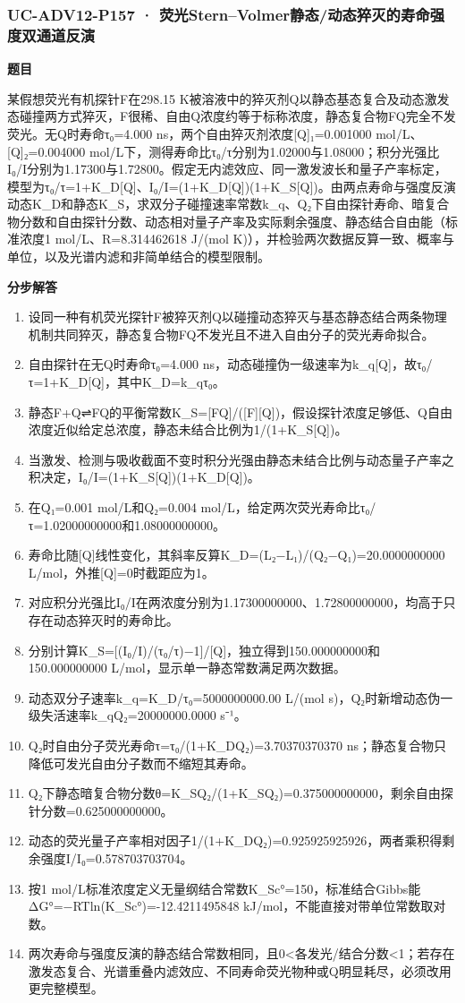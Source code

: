 \documentclass[UTF8,11pt,a4paper]{ctexart}
\begin{document}
\subsubsection*{UC-ADV12-P157 · 荧光Stern–Volmer静态/动态猝灭的寿命强度双通道反演}
\noindent\textbf{题目}\par
某假想荧光有机探针F在298.15 K被溶液中的猝灭剂Q以静态基态复合及动态激发态碰撞两方式猝灭，F很稀、自由Q浓度约等于标称浓度，静态复合物FQ完全不发荧光。无Q时寿命τ₀=4.000 ns，两个自由猝灭剂浓度[Q]₁=0.001000 mol/L、[Q]₂=0.004000 mol/L下，测得寿命比τ₀/τ分别为1.02000与1.08000；积分光强比I₀/I分别为1.17300与1.72800。假定无内滤效应、同一激发波长和量子产率标定，模型为τ₀/τ=1+K\_D[Q]、I₀/I=(1+K\_D[Q])(1+K\_S[Q])。由两点寿命与强度反演动态K\_D和静态K\_S，求双分子碰撞速率常数k\_q、Q₂下自由探针寿命、暗复合物分数和自由探针分数、动态相对量子产率及实际剩余强度、静态结合自由能（标准浓度1 mol/L、R=8.314462618 J/(mol K)），并检验两次数据反算一致、概率与单位，以及光谱内滤和非简单结合的模型限制。\par
\medskip\noindent\textbf{分步解答}
\begin{enumerate}
\item 设同一种有机荧光探针F被猝灭剂Q以碰撞动态猝灭与基态静态结合两条物理机制共同猝灭，静态复合物FQ不发光且不进入自由分子的荧光寿命拟合。
\item 自由探针在无Q时寿命τ₀=4.000 ns，动态碰撞伪一级速率为k\_q[Q]，故τ₀/τ=1+K\_D[Q]，其中K\_D=k\_qτ₀。
\item 静态F+Q⇌FQ的平衡常数K\_S=[FQ]/([F][Q])，假设探针浓度足够低、Q自由浓度近似给定总浓度，静态未结合比例为1/(1+K\_S[Q])。
\item 当激发、检测与吸收截面不变时积分光强由静态未结合比例与动态量子产率之积决定，I₀/I=(1+K\_S[Q])(1+K\_D[Q])。
\item 在Q₁=0.001 mol/L和Q₂=0.004 mol/L，给定两次荧光寿命比τ₀/τ=1.02000000000和1.08000000000。
\item 寿命比随[Q]线性变化，其斜率反算K\_D=(L₂−L₁)/(Q₂−Q₁)=20.0000000000 L/mol，外推[Q]=0时截距应为1。
\item 对应积分光强比I₀/I在两浓度分别为1.17300000000、1.72800000000，均高于只存在动态猝灭时的寿命比。
\item 分别计算K\_S=[(I₀/I)/(τ₀/τ)−1]/[Q]，独立得到150.000000000和150.000000000 L/mol，显示单一静态常数满足两次数据。
\item 动态双分子速率k\_q=K\_D/τ₀=5000000000.00 L/(mol s)，Q₂时新增动态伪一级失活速率k\_qQ₂=20000000.0000 s⁻¹。
\item Q₂时自由分子荧光寿命τ=τ₀/(1+K\_DQ₂)=3.70370370370 ns；静态复合物只降低可发光自由分子数而不缩短其寿命。
\item Q₂下静态暗复合物分数θ=K\_SQ₂/(1+K\_SQ₂)=0.375000000000，剩余自由探针分数=0.625000000000。
\item 动态的荧光量子产率相对因子1/(1+K\_DQ₂)=0.925925925926，两者乘积得剩余强度I/I₀=0.578703703704。
\item 按1 mol/L标准浓度定义无量纲结合常数K\_Sc°=150，标准结合Gibbs能ΔG°=−RTln(K\_Sc°)=-12.4211495848 kJ/mol，不能直接对带单位常数取对数。
\item 两次寿命与强度反演的静态结合常数相同，且0<各发光/结合分数<1；若存在激发态复合、光谱重叠内滤效应、不同寿命荧光物种或Q明显耗尽，必须改用更完整模型。
\end{enumerate}
\end{document}
